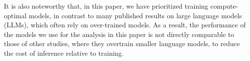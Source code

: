  It is also noteworthy that, in this paper, we have prioritized training compute-optimal models, in contrast to many published results on large language models (LLMs), which often rely on over-trained models. As a result, the performance of the models we use for the analysis in this paper is not directly comparable to those of other studies, where they overtrain smaller language models, to reduce the cost of inference relative to training.  

\newpage